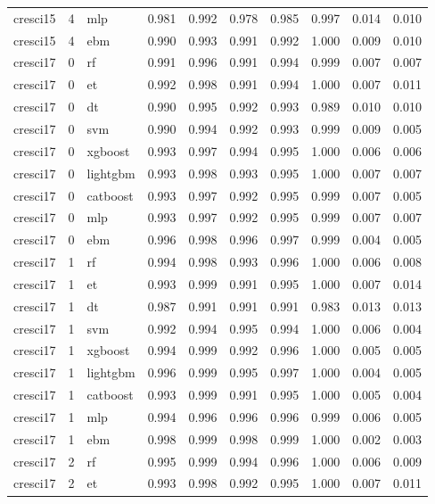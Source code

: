 \begin{tabular}{lrlrrrrrrr}
cresci15 & 4 & mlp & 0.981 & 0.992 & 0.978 & 0.985 & 0.997 & 0.014 & 0.010 \\
cresci15 & 4 & ebm & 0.990 & 0.993 & 0.991 & 0.992 & 1.000 & 0.009 & 0.010 \\
cresci17 & 0 & rf & 0.991 & 0.996 & 0.991 & 0.994 & 0.999 & 0.007 & 0.007 \\
cresci17 & 0 & et & 0.992 & 0.998 & 0.991 & 0.994 & 1.000 & 0.007 & 0.011 \\
cresci17 & 0 & dt & 0.990 & 0.995 & 0.992 & 0.993 & 0.989 & 0.010 & 0.010 \\
cresci17 & 0 & svm & 0.990 & 0.994 & 0.992 & 0.993 & 0.999 & 0.009 & 0.005 \\
cresci17 & 0 & xgboost & 0.993 & 0.997 & 0.994 & 0.995 & 1.000 & 0.006 & 0.006 \\
cresci17 & 0 & lightgbm & 0.993 & 0.998 & 0.993 & 0.995 & 1.000 & 0.007 & 0.007 \\
cresci17 & 0 & catboost & 0.993 & 0.997 & 0.992 & 0.995 & 0.999 & 0.007 & 0.005 \\
cresci17 & 0 & mlp & 0.993 & 0.997 & 0.992 & 0.995 & 0.999 & 0.007 & 0.007 \\
cresci17 & 0 & ebm & 0.996 & 0.998 & 0.996 & 0.997 & 0.999 & 0.004 & 0.005 \\
cresci17 & 1 & rf & 0.994 & 0.998 & 0.993 & 0.996 & 1.000 & 0.006 & 0.008 \\
cresci17 & 1 & et & 0.993 & 0.999 & 0.991 & 0.995 & 1.000 & 0.007 & 0.014 \\
cresci17 & 1 & dt & 0.987 & 0.991 & 0.991 & 0.991 & 0.983 & 0.013 & 0.013 \\
cresci17 & 1 & svm & 0.992 & 0.994 & 0.995 & 0.994 & 1.000 & 0.006 & 0.004 \\
cresci17 & 1 & xgboost & 0.994 & 0.999 & 0.992 & 0.996 & 1.000 & 0.005 & 0.005 \\
cresci17 & 1 & lightgbm & 0.996 & 0.999 & 0.995 & 0.997 & 1.000 & 0.004 & 0.005 \\
cresci17 & 1 & catboost & 0.993 & 0.999 & 0.991 & 0.995 & 1.000 & 0.005 & 0.004 \\
cresci17 & 1 & mlp & 0.994 & 0.996 & 0.996 & 0.996 & 0.999 & 0.006 & 0.005 \\
cresci17 & 1 & ebm & 0.998 & 0.999 & 0.998 & 0.999 & 1.000 & 0.002 & 0.003 \\
cresci17 & 2 & rf & 0.995 & 0.999 & 0.994 & 0.996 & 1.000 & 0.006 & 0.009 \\
cresci17 & 2 & et & 0.993 & 0.998 & 0.992 & 0.995 & 1.000 & 0.007 & 0.011 \\

\end{tabular}
